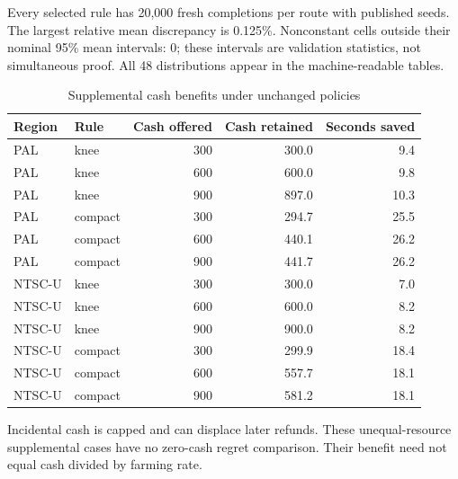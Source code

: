 \documentclass[11pt]{article}
\theoremstyle{definition}\newtheorem{definition}[theorem]{Definition}
\begin{document}
Every selected rule has 20,000 fresh completions per route with published seeds. The largest relative mean discrepancy is 0.125\%. Nonconstant cells outside their nominal 95\% mean intervals: 0; these intervals are validation statistics, not simultaneous proof. All 48 distributions appear in the machine-readable tables. \begin{table}[H]\centering\small
\begin{tabular}{llrrr}\toprule
Region & Rule & Cash offered & Cash retained & Seconds saved\\\midrule
PAL & knee & 300 & 300.0 & 9.4\\
PAL & knee & 600 & 600.0 & 9.8\\
PAL & knee & 900 & 897.0 & 10.3\\
PAL & compact & 300 & 294.7 & 25.5\\
PAL & compact & 600 & 440.1 & 26.2\\
PAL & compact & 900 & 441.7 & 26.2\\
NTSC-U & knee & 300 & 300.0 & 7.0\\
NTSC-U & knee & 600 & 600.0 & 8.2\\
NTSC-U & knee & 900 & 900.0 & 8.2\\
NTSC-U & compact & 300 & 299.9 & 18.4\\
NTSC-U & compact & 600 & 557.7 & 18.1\\
NTSC-U & compact & 900 & 581.2 & 18.1\\
\bottomrule\end{tabular}
\caption{Supplemental cash benefits under unchanged policies}\label{tab:result-13}\end{table}
Incidental cash is capped and can displace later refunds. These unequal-resource supplemental cases have no zero-cash regret comparison. Their benefit need not equal cash divided by farming rate.
\end{document}
